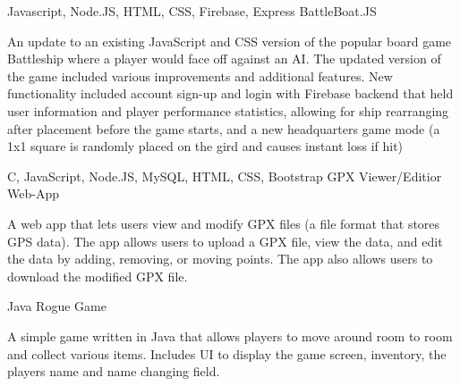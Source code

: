 


\begin{cventries}


\cventry
{Javascript, Node.JS, HTML, CSS, Firebase, Express} %
{BattleBoat.JS} %
{}
{}
{ %
\begin{cvitems}
\item {An update to an existing JavaScript and CSS version of the popular board game Battleship where a player would face off against an AI. The updated version of the game included various improvements and additional features. New functionality included account sign-up and login with Firebase backend that held user information and player performance statistics, allowing for ship rearranging after placement before the game starts, and a new headquarters game mode (a 1x1 square is randomly placed on the gird and causes instant loss if hit)}
\end{cvitems}
}


\cventry
{C, JavaScript, Node.JS, MySQL, HTML, CSS, Bootstrap} %
{GPX Viewer/Editior Web-App} %
{}
{}
{ %
\begin{cvitems}
\item {A web app that lets users view and modify GPX files (a file format that stores GPS data). The app allows users to upload a GPX file, view the data, and edit the data by adding, removing, or moving points. The app also allows users to download the modified GPX file.}
\end{cvitems}
}

\cventry
{Java} %
{Rogue Game} %
{}
{}
{ %
\begin{cvitems}
\item {A simple game written in Java that allows players to move around room to room and collect various items. Includes UI to display the game screen, inventory, the players name and name changing field.}
\end{cvitems}
}


\end{cventries}